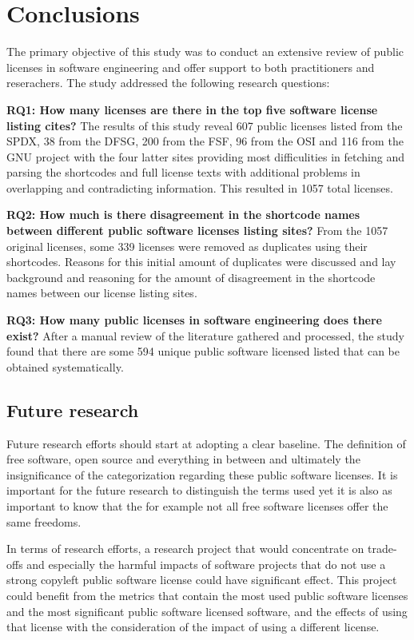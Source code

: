 \chapter{Conclusions\label{conclusions}}
The primary objective of this study was to conduct an extensive review of public licenses in software engineering and offer support to both practitioners and reserachers. The study addressed the following research questions:

\textbf{RQ1: How many licenses are there in the top five software license listing cites?} The results of this study reveal 607 public licenses listed from the SPDX, 38 from the DFSG, 200 from the FSF, 96 from the OSI and 116 from the GNU project with the four latter sites providing most difficulities in fetching and parsing the shortcodes and full license texts with additional problems in overlapping and contradicting information. This resulted in 1057 total licenses.

\textbf{RQ2: How much is there disagreement in the shortcode names between different public software licenses listing sites?} From the 1057 original licenses, some 339 licenses were removed as duplicates using their shortcodes. Reasons for this initial amount of duplicates were discussed and lay background and reasoning for the amount of disagreement in the shortcode names between our license listing sites.

\textbf{RQ3: How many public licenses in software engineering does there exist?} After a manual review of the literature gathered and processed, the study found that there are some 594 unique public software licensed listed that can be obtained systematically. 


\section{Future research}
Future research efforts should start at adopting a clear baseline. The definition of free software, open source and everything in between and ultimately the insignificance of the categorization regarding these public software licenses. It is important for the future research to distinguish the terms used yet it is also as important to know that the for example not all free software licenses offer the same freedoms.

In terms of research efforts, a research project that would concentrate on trade-offs and especially the harmful impacts of software projects that do not use a strong copyleft public software license could have significant effect. This project could benefit from the metrics that contain the most used public software licenses and the most significant public software licensed software, and the effects of using that license with the consideration of the impact of using a different license. 

